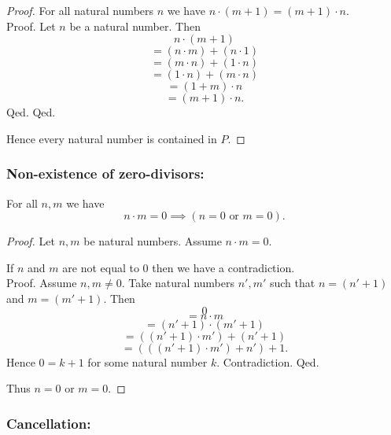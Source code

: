 \documentclass[../../arithmetic.ftl.tex]{subfiles}
\begin{document}
\begin{forthel}
\begin{proof}
        For all natural numbers $n$ we have $n \cdot (m + 1) = (m + 1) \cdot n$. \\
        Proof.
          Let $n$ be a natural number.
          Then
          \[ n \cdot (m + 1) \]
          \[ = (n \cdot m) + (n \cdot 1) \]
          \[ = (m \cdot n) + (1 \cdot n) \]
          \[ = (1 \cdot n) + (m \cdot n) \]
          \[ = (1 + m) \cdot n \]
          \[ = (m + 1) \cdot n. \]
        Qed.
      Qed.

      Hence every natural number is contained in $P$.
    \end{proof}
  \end{forthel}


  \subsubsection*{Non-existence of zero-divisors:}

  \begin{forthel}
    \begin{proposition}\label{Arithmetic_01_03_692941}
      For all $n,m$ we have \[ n \cdot m = 0 \implies (\text{$n = 0$ or $m = 0$}). \]
    \end{proposition}
    \begin{proof}
      Let $n,m$ be natural numbers.
      Assume $n \cdot m = 0$.

      If $n$ and $m$ are not equal to $0$ then we have a contradiction. \\
      Proof.
        Assume $n,m \neq 0$.
        Take natural numbers $n',m'$ such that $n = (n' + 1)$ and $m = (m' + 1)$.
        Then
        \[   0 \]
        \[ = n \cdot m \]
        \[ = (n' + 1) \cdot (m' + 1) \]
        \[ = ((n' + 1) \cdot m') + (n' + 1) \]
        \[ = (((n' + 1) \cdot m') + n') + 1. \]
        Hence $0 = k + 1$ for some natural number $k$.
        Contradiction.
      Qed.

      Thus $n = 0$ or $m = 0$.
    \end{proof}
  \end{forthel}


  \subsubsection*{Cancellation:}
\end{document}
